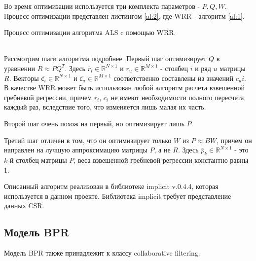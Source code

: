 \documentclass[14pt]{mmcs_article}
\begin{document}
Во время оптимизации используется три комплекта параметров - $P, Q, W$. Процесс оптимизации представлен листингом \ref{al:2}, где WRR - алгоритм \ref{al:1}.\\
\begin{algorithm}[H]\label{al:2}
	\caption{Процесс оптимизации алгоритма ALS c помощью WRR.}
\end{algorithm}
\ \\
Рассмотрим шаги алгоритма подробнее.
Первый шаг оптимизирует $Q$ в уравнении $R \approx PQ^T$. Здесь $\bar r_i \in \mathbb{R}^{N \times 1}$  и  $r_u \in \mathbb{R}^{M \times 1}$ - столбец $i$ и ряд $u$ матрицы $R$. Векторы $ \bar{с_i} \in \mathbb{R}^{N \times 1}$ и $\bar{с_u} \in \mathbb{R}^{M \times 1}$ соответственно составлены из значений $c_ui$. В качестве WRR может быть использован любой алгоритм расчета взвешенной гребневой регрессии, причем $\bar r_i$, $\bar c_i$ не имеют необходимости полного пересчета каждый раз, вследствие того, что изменяется лишь малая их часть. 

Второй шаг очень похож на первый, но оптимизирует лишь $P$. 

Третий шаг отличен в том, что он оптимизирует только $W$ из $P \approx BW$, причем он направлен на лучшую аппроксимацию матрицы $P$, а не $R$. Здесь  $\bar p_k \in \mathbb{R}^{N \times 1}$ - это $k$-й столбец матрицы $P$, веса взвешенной гребневой регрессии константно равны 1.

Описанный алгоритм реализован в библиотеке implicit v.0.4.4, которая используется в данном проекте. Библиотека implicit требует представление данных CSR.


\subsection{Модель BPR}
Модель BPR также принадлежит к классу collaborative filtering. 
\end{document}
